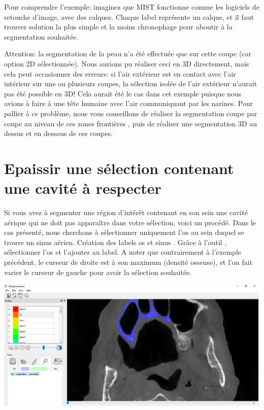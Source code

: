 \documentclass {article}
\begin{document}
Pour comprendre l'exemple: imaginez que MIST fonctionne comme les logiciels de retouche d'image, avec des calques. Chaque label représente un calque, et il faut trouver solution la plus simple et la moins chronophage pour aboutir à la segmentation souhaitée.	

Attention: la segmentation de la peau n'a été effectuée que sur cette coupe (car option 2D sélectionnée). Nous aurions pu réaliser ceci en 3D directement, mais cela peut occasionner des erreurs: si l'air extérieur est en contact avec l'air intérieur sur une ou plusieurs coupes, la sélection isolée de l'air extérieur n'aurait pas été possible en 3D! Cela aurait été le cas dans cet exemple puisque nous avions à faire à une tête humaine avec l'air communiquant par les narines. Pour pallier à ce problème, nous vous conseillons de réaliser la segmentation coupe par coupe au niveau de ces \og zones frontières \fg , puis de réaliser une segmentation 3D au dessus et en dessous de ces coupes.  

\newpage

\section{Epaissir une sélection contenant une cavité à respecter}

Si vous avez à segmenter une région d'intérêt contenant en son sein une cavité aérique qui ne doit pas apparaître dans votre sélection, voici un procédé. Dans le cas présenté, nous cherchons à sélectionner uniquement l'os au sein duquel se trouve un sinus aérien. Création des labels \og os \fg et \og sinus \fg . Grâce à l'outil , sélectionner l'os et l'ajouter au label. A noter que contrairement à l'exemple précédent, le curseur de droite est à son maximum (densité osseuse), et l'on fait varier le curseur de gauche pour avoir la sélection souhaitée.

\begin{center}
\includegraphics[scale=0.5]{Iconographie/Exemple_2_1.jpg}
\end{center}
\end{document}
